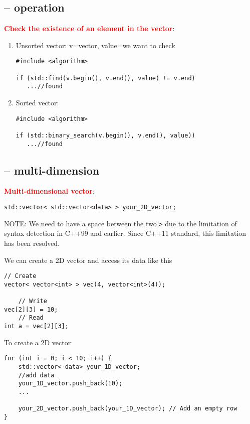 \subsection{-- operation}

\textcolor{red}{\bf Check the existence of an element in the vector}:
\begin{enumerate}
  \item Unsorted vector: v=vector, value=we want to check
\begin{verbatim}
#include <algorithm>

if (std::find(v.begin(), v.end(), value) != v.end)
   ...//found
\end{verbatim}

  \item Sorted vector:
\begin{verbatim}
#include <algorithm>

if (std::binary_search(v.begin(), v.end(), value))
   ...//found
\end{verbatim}
\end{enumerate}

\subsection{-- multi-dimension}

\textcolor{red}{\bf Multi-dimensional vector}: 
\begin{verbatim}
std::vector< std::vector<data> > your_2D_vector;
\end{verbatim}
NOTE: We need to have a space between the two \verb!>! due to the limitation of
syntax detection in C++99 and earlier. Since C++11 standard, this limitation has
been resolved.

We can create a 2D vector and access its data like this
\begin{verbatim}
// Create
vector< vector<int> > vec(4, vector<int>(4));
    
    // Write
vec[2][3] = 10;
    // Read
int a = vec[2][3];
\end{verbatim}

To create a 2D vector
\begin{verbatim}
for (int i = 0; i < 10; i++) {
    std::vector< data> your_1D_vector;
    //add data
    your_1D_vector.push_back(10);
    ...
    
    your_2D_vector.push_back(your_1D_vector); // Add an empty row
}

\end{verbatim}

